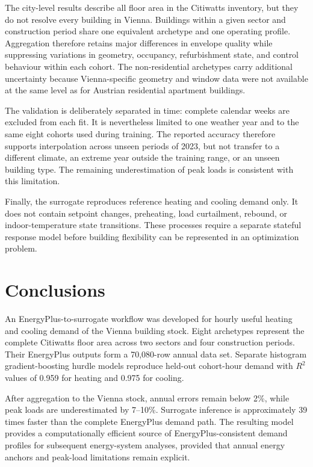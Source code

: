 \documentclass[10pt,twocolumn]{article}
\begin{document}
The city-level results describe all floor area in the Citiwatts inventory, but
they do not resolve every building in Vienna. Buildings within a given sector
and construction period share one equivalent archetype and one operating
profile. Aggregation therefore retains major differences in envelope quality
while suppressing variations in geometry, occupancy, refurbishment state, and
control behaviour within each cohort. The non-residential archetypes carry
additional uncertainty because Vienna-specific geometry and window data were
not available at the same level as for Austrian residential apartment
buildings.

The validation is deliberately separated in time: complete calendar weeks are
excluded from each fit. It is nevertheless limited to one weather year and to
the same eight cohorts used during training. The reported accuracy therefore
supports interpolation across unseen periods of 2023, but not transfer to a
different climate, an extreme year outside the training range, or an unseen
building type. The remaining underestimation of peak loads is consistent with
this limitation.

Finally, the surrogate reproduces reference heating and cooling demand only.
It does not contain setpoint changes, preheating, load curtailment, rebound, or
indoor-temperature state transitions. These processes require a separate
stateful response model before building flexibility can be represented in an
optimization problem.

\section{Conclusions}

An EnergyPlus-to-surrogate workflow was developed for hourly useful heating
and cooling demand of the Vienna building stock. Eight archetypes represent
the complete Citiwatts floor area across two sectors and four construction
periods. Their EnergyPlus outputs form a 70,080-row annual data set. Separate
histogram gradient-boosting hurdle models reproduce held-out cohort-hour
demand with $R^2$ values of 0.959 for heating and 0.975 for cooling.

After aggregation to the Vienna stock, annual errors remain below 2\%, while
peak loads are underestimated by 7--10\%. Surrogate inference is approximately
39 times faster than the complete EnergyPlus demand path. The resulting model
provides a computationally efficient source of EnergyPlus-consistent demand
profiles for subsequent energy-system analyses, provided that annual energy
anchors and peak-load limitations remain explicit.
\end{document}
